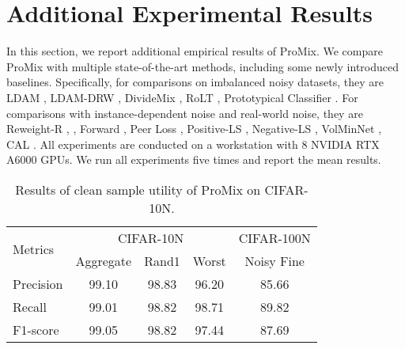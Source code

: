 \documentclass{article}
\begin{document}
\section{Additional Experimental Results}\label{sec:app_b}
In this section, we report additional empirical results of ProMix. We compare ProMix with multiple state-of-the-art methods, including some newly introduced baselines. Specifically, for comparisons on imbalanced noisy datasets, they are LDAM \cite{DBLP:conf/nips/CaoWGAM19}, LDAM-DRW \cite{DBLP:conf/nips/CaoWGAM19}, DivideMix \cite{DBLP:conf/iclr/LiSH20}, RoLT \cite{DBLP:journals/corr/abs-2108-11569}, Prototypical Classifier \cite{DBLP:conf/pakdd/WeiSLZ22}. For comparisons with instance-dependent noise and real-world noise, they are Reweight-R \cite{DBLP:conf/nips/XiaLW00NS19},  \cite{DBLP:conf/nips/XuCKW19}, Forward  \cite{DBLP:conf/cvpr/PatriniRMNQ17},  Peer Loss \cite{DBLP:conf/icml/LiuG20}, Positive-LS \cite{DBLP:conf/icml/LukasikBMK20}, Negative-LS \cite{DBLP:journals/corr/abs-2106-04149}, VolMinNet \cite{DBLP:conf/icml/LiL00S21}, CAL \cite{DBLP:conf/cvpr/ZhuL021}. All experiments are conducted on a workstation with 8 NVIDIA RTX A6000 GPUs. We run all experiments five times and report the mean results. 

\begin{table}[!t]
    \centering
    \small
\tabcolsep=0.2cm
    \begin{tabular}{l|ccc|c}
        \toprule
        \multirow{2}{*}{Metrics}& \multicolumn{3}{c|}{CIFAR-10N} & CIFAR-100N \\
        \cmidrule{2-5}
        & Aggregate  & Rand1  & Worst & Noisy Fine   \\
        \midrule
        Precision      &  99.10    & 98.83  & 96.20 & 85.66\\
        Recall         &  99.01	& 98.82  & 98.71 & 89.82\\
        F1-score      & 99.05	& 98.82  & 97.44 & 87.69 \\
        \bottomrule
    \end{tabular}
    \caption{Results of clean sample utility of ProMix on CIFAR-10N. }
    \label{tab:ciarn_uti}
\end{table}
\end{document}
